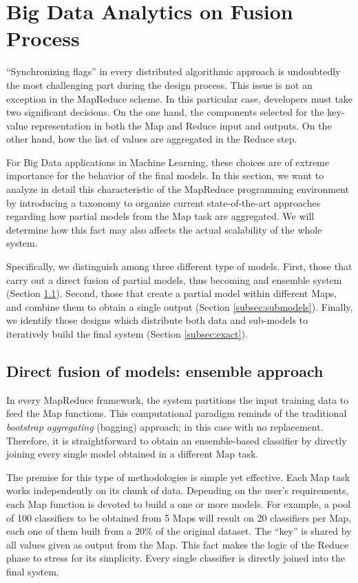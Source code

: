 \documentclass[3p,review]{elsarticle}
\begin{document}
\section{Big Data Analytics on Fusion Process}\label{sec:fusion}

``Synchronizing flags'' in every distributed algorithmic approach is undoubtedly the most challenging part during the design process. This issue is not an exception in the MapReduce scheme. In this particular case, developers must take two significant decisions. On the one hand, the components selected for the key-value representation in both the Map and Reduce input and outputs. On the other hand, how the list of values are aggregated in the Reduce step. 

For Big Data applications in Machine Learning, these choices are of extreme importance for the behavior of the final models. In this section, we want to analyze in detail this characteristic of the MapReduce programming environment by introducing a taxonomy to organize current state-of-the-art approaches regarding how partial models from the Map task are aggregated. We will determine how this fact may also affects the actual scalability of the whole system. 

Specifically, we distinguish among three different type of models. First, those that carry out a direct fusion of partial models, thus becoming and ensemble system (Section \ref{subsec:ensemble}). Second, those that create a partial model within different Maps, and combine them to obtain a single output (Section \ref{subsec:submodels}). Finally, we identify those designs which distribute both data and sub-models to iteratively build the final system (Section \ref{subsec:exact}).

\subsection{Direct fusion of models: ensemble approach}\label{subsec:ensemble}

In every MapReduce framework, the system partitions the input training data to feed the Map functions. This computational paradigm reminds of the traditional \textit{bootstrap aggregating} (bagging) approach; in this case with no replacement. Therefore, it is straightforward to obtain an ensemble-based classifier \cite{Polikar2006} by directly joining every single model obtained in a different Map task. 

The premise for this type of methodologies is simple yet effective. Each Map task works independently on its chunk of data. Depending on the user's requirements, each Map function is devoted to build a one or more models. For example, a pool of 100 classifiers to be obtained from 5 Maps will result on 20 classifiers per Map, each one of them built from a 20\% of the original dataset. The ``key'' is shared by all values given as output from the Map. This fact makes the logic of the Reduce phase to stress for its simplicity. Every single classifier is directly joined into the final system. 
\end{document}
